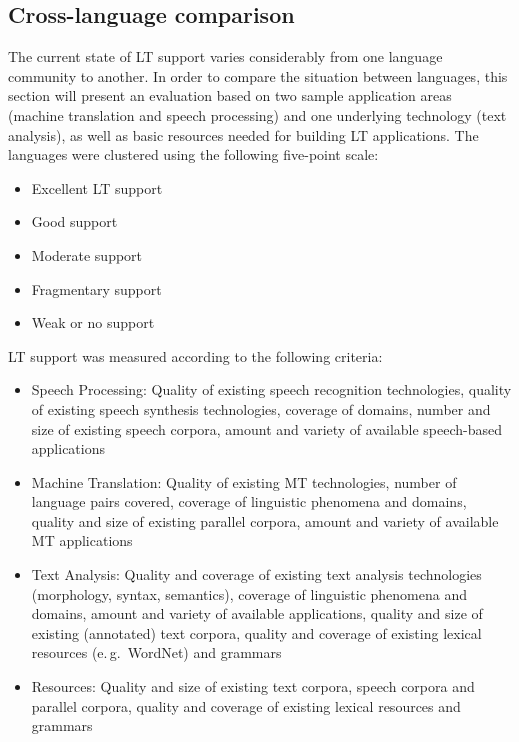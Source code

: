 {\begin{multicols}{2}
 \subsection {Cross-language comparison}
   
The current state of LT support varies considerably from one language community to another. In order to compare the situation between languages, this section will present an evaluation based on two sample application areas (machine translation and speech processing) and one underlying technology (text analysis), as well as basic resources needed for building LT applications. 
The languages were clustered using the following five-point scale: 

    \begin{itemize}
      \item Excellent LT support
      \item Good support
      \item Moderate support
      \item Fragmentary support 
      \item Weak or no support
    \end{itemize}

LT support was measured according to the following criteria:
\begin{itemize}
\item Speech Processing: Quality of existing speech recognition technologies, quality of existing speech synthesis technologies, coverage of domains, number and size of existing speech corpora, amount and variety of available speech-based applications
\item Machine Translation: Quality of existing MT technologies, number of language pairs covered, coverage of linguistic phenomena and domains, quality and size of existing parallel corpora, amount and variety of available MT applications
\item Text Analysis: Quality and coverage of existing text analysis technologies (morphology, syntax, semantics), coverage of linguistic phenomena and domains, amount and variety of available applications, quality and size of existing (annotated) text corpora, quality and coverage of existing lexical resources (e.\,g.~WordNet) and grammars
\item Resources: Quality and size of existing text corpora, speech corpora and parallel corpora, quality and coverage of existing lexical resources and grammars
\end{itemize} 





\end{multicols}}

